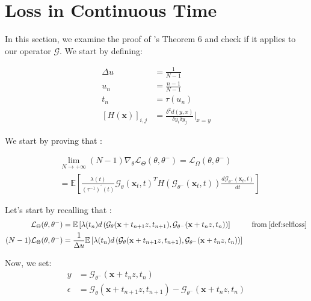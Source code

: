 \section{Loss in Continuous Time} \label{app:continuous}

In this section, we examine the proof of \cite{song2023consistencymodels}'s Theorem 6 and check if it applies to our operator $\mathcal{G}$. We start by defining:

\begin{align}
    \Delta u & = \frac{1}{N - 1} \\
    u_n & = \frac{n - 1}{N - 1} \\
    t_n & = \tau(u_n) \\
    [H(\mathbf{x})]_{i, j} & = \frac{\delta^2d(y, x)}{\delta y_i \delta y_j} \lvert_{x=  y} \label{def:H}
\end{align}

\noindent We start by proving that : 

\begin{align}
    & \lim_{N \rightarrow + \infty} (N - 1)\nabla_{\theta}\mathcal{L}_{\Theta}(\theta, \theta^{-}) = \mathcal{L}_{\Omega}(\theta, \theta^{-}) \\
    & = \mathbb{E} \left[ \frac{\lambda(t)}{(\tau^{-1})^{'}(t)}\mathcal{G}_{\theta}(\mathbf{x}_t, t)^T H(\mathcal{G}_{\theta^{-}}(\mathbf{x}_t, t)) \frac{d \mathcal{G}_{\theta^{-}}(\mathbf{x}_t, t)}{dt} \right]
\end{align} 

\noindent Let's start by recalling that :
\begin{align}
        \mathcal{L}_{\Theta}(\theta, \theta^{-}) & = \mathbb{E}\left[ \lambda(t_n) d \left(\mathcal{G}_{\theta}(\mathbf{x} + t_{n+1}z, t_{n+1}), \mathcal{G}_{\theta^-}(\mathbf{x} + t_nz, t_{n}) \right)\right] & \: \text{from} \: \ref{def:selfloss} \\
        (N - 1) \mathcal{L}_{\Theta}(\theta, \theta^{-}) & = \frac{1}{\Delta u}\mathbb{E}\left[ \lambda(t_n) d \left(\mathcal{G}_{\theta}(\mathbf{x} + t_{n+1}z, t_{n+1}), \mathcal{G}_{\theta^-}(\mathbf{x} + t_nz, t_{n}) \right)\right] 
\end{align}

\noindent Now, we set:
\begin{align}
    y &= \mathcal{G}_{\theta^-}(\mathbf{x} + t_nz, t_{n}) \\
    \epsilon & = \mathcal{G}_{\theta}(\mathbf{x} + t_{n+1}z, t_{n+1}) - \mathcal{G}_{\theta^-}(\mathbf{x} + t_nz, t_{n})
\end{align}


